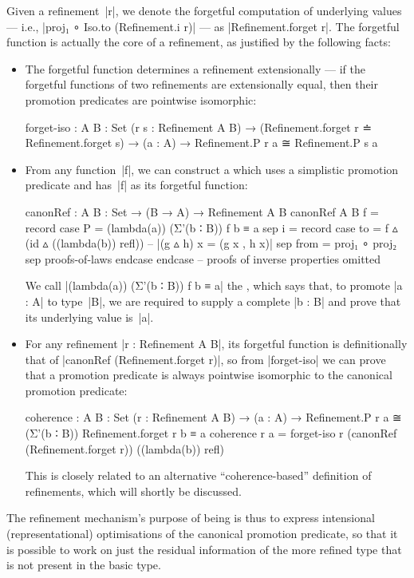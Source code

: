 Given a refinement~|r|, we denote the forgetful computation of underlying values --- i.e., |proj₁ ∘ Iso.to (Refinement.i r)| --- as |Refinement.forget r|.
The forgetful function is actually the core of a refinement, as justified by the following facts:
\begin{itemize}
\item The forgetful function determines a refinement extensionally --- if the forgetful functions of two refinements are extensionally equal, then their promotion predicates are pointwise isomorphic:
\begin{code}
forget-iso :  {A B : Set} (r s : Refinement A B) →
              (Refinement.forget r ≐ Refinement.forget s) →
              (a : A) → Refinement.P r a ≅ Refinement.P s a
\end{code}
\item From any function~|f|, we can construct a  which uses a simplistic promotion predicate and has~|f| as its forgetful function:
\begin{code}
canonRef : {A B : Set} → (B → A) → Refinement A B
canonRef {A} {B} f = record
  case  P  =  (lambda(a)) (Σ'(b ∶ B)) f b ≡ a
  sep   i  =  record
                case  to    =  f ▵ (id ▵ ((lambda(b)) refl))  -- |(g ▵ h) x = (g x , h x)|
                sep   from  =  proj₁ ∘ proj₂
                sep   proofs-of-laws endcase endcase  -- proofs of inverse properties omitted
\end{code}
We call |(lambda(a)) (Σ'(b ∶ B)) f b ≡ a| the , which says that, to promote |a : A| to type~|B|, we are required to supply a complete |b : B| and prove that its underlying value is~|a|.
\item For any refinement |r : Refinement A B|, its forgetful function is definitionally that of |canonRef (Refinement.forget r)|, so from |forget-iso| we can prove that a promotion predicate is always pointwise isomorphic to the canonical promotion predicate:
\begin{code}
coherence :
  {A B : Set} (r : Refinement A B) →
  (a : A) → Refinement.P r a ≅ (Σ'(b ∶ B)) Refinement.forget r b ≡ a
coherence r a = forget-iso r (canonRef (Refinement.forget r)) ((lambda(b)) refl)
\end{code}
This is closely related to an alternative ``coherence-based'' definition of refinements, which will shortly be discussed.
\end{itemize}
The refinement mechanism's purpose of being is thus to express intensional (representational) optimisations of the canonical promotion predicate, so that it is possible to work on just the residual information of the more refined type that is not present in the basic type.

